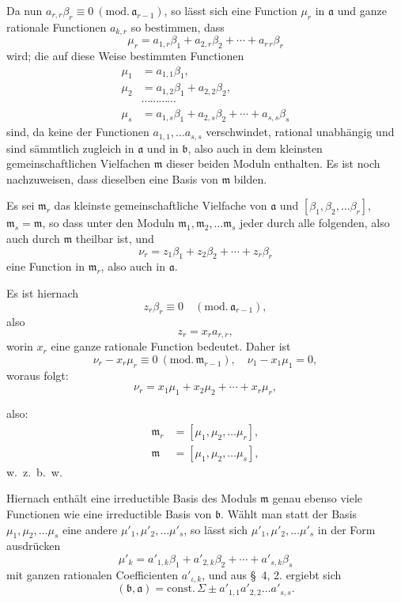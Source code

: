 \documentclass{article}
\begin{document}
Da nun $a_{r,r}\beta_{r} \equiv 0 \ (\text{mod.}\,\mathfrak{a}_{r-1})$, so lässt sich eine Function $\mu_{r}$ in $\mathfrak{a}$ und ganze rationale Functionen $a_{k,r}$ so bestimmen, dass
\[ \mu_{r} = a_{1,r}\beta_{1} + a_{2,r}\beta_{2} + \cdots + a_{r\,r}\beta_{r} \]
wird; die auf diese Weise bestimmten Functionen
\[ \begin{aligned} \mu_{1} &= a_{1,1}\beta_{1}, \\ \mu_{2} &= a_{1,2}\beta_{1} + a_{2,2}\beta_{2}, \\ &\cdots\cdots\cdots\cdots \\ \mu_{s} &= a_{1,s}\beta_{1} + a_{2,s}\beta_{2} + \cdots + a_{s,s}\beta_{s} \end{aligned} \]
sind, da keine der Functionen $a_{1,1}, \ldots a_{s,s}$ verschwindet, rational unabhängig und sind sämmtlich zugleich in $\mathfrak{a}$ und in $\mathfrak{b}$, also auch in dem kleinsten gemeinschaftlichen Vielfachen $\mathfrak{m}$ dieser beiden Moduln enthalten. Es ist noch nachzuweisen, dass dieselben eine Basis von $\mathfrak{m}$ bilden.

Es sei $\mathfrak{m}_{r}$ das kleinste gemeinschaftliche Vielfache von $\mathfrak{a}$ und $[\beta_{1}, \beta_{2}, \ldots \beta_{r}]$, $\mathfrak{m}_{s} = \mathfrak{m}$, so dass unter den Moduln $\mathfrak{m}_{1}, \mathfrak{m}_{2}, \ldots \mathfrak{m}_{s}$ jeder durch alle folgenden, also auch durch $\mathfrak{m}$ theilbar ist, und
\[ \nu_{r} = z_{1}\beta_{1} + z_{2}\beta_{2} + \cdots + z_{r}\beta_{r} \]
eine Function in $\mathfrak{m}_{r}$, also auch in $\mathfrak{a}$.

Es ist hiernach
\[ z_{r}\beta_{r} \equiv 0 \quad (\text{mod.}\,\mathfrak{a}_{r-1}), \]
also
\[ z_{r} = x_{r}a_{r,r}, \]
worin $x_{r}$ eine ganze rationale Function bedeutet. Daher ist
\[ \nu_{r} - x_{r}\mu_{r} \equiv 0 \ (\text{mod.}\,\mathfrak{m}_{r-1}), \quad \nu_{1} - x_{1}\mu_{1} = 0, \]
woraus folgt:
\[ \nu_{r} = x_{1}\mu_{1} + x_{2}\mu_{2} + \cdots + x_{r}\mu_{r}, \]

also:
\[ \begin{aligned} \mathfrak{m}_{r} &= [\mu_{1}, \mu_{2}, \ldots \mu_{r}], \\ \mathfrak{m} &= [\mu_{1}, \mu_{2}, \ldots \mu_{s}], \end{aligned} \]
w.\ z.\ b.\ w.

Hiernach enthält eine irreductible Basis des Moduls $\mathfrak{m}$ genau ebenso viele Functionen wie eine irreductible Basis von $\mathfrak{b}$. Wählt man statt der Basis $\mu_{1}, \mu_{2}, \ldots \mu_{s}$ eine andere $\mu'_{1}, \mu'_{2}, \ldots \mu'_{s}$, so lässt sich $\mu'_{1}, \mu'_{2}, \ldots \mu'_{s}$ in der Form ausdrücken
\[ \mu'_{k} = a'_{1,k}\beta_{1} + a'_{2,k}\beta_{2} + \cdots + a'_{s,k}\beta_{s} \]
mit ganzen rationalen Coefficienten $a'_{\iota,k}$, und aus §~4, 2. ergiebt sich
\[ (\mathfrak{b}, \mathfrak{a}) = \text{const.}\,\Sigma \pm a'_{1,1}a'_{2,2}\ldots a'_{s,s}. \]
\end{document}
